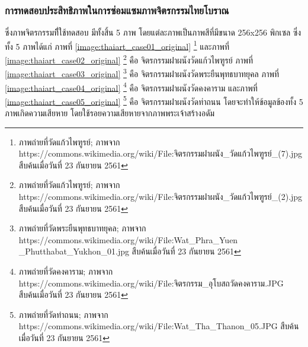 \documentclass[hidelinks, a4paper,12pt]{article}
\numberwithin{equation}{section}							%
\numberwithin{equation}{section}
\begin{document}
{	\subsubsection{การทดสอบประสิทธิภาพในการซ่อมแซมภาพจิตรกรรมไทยโบราณ}
	\hspace{1cm}ซึ่งภาพจิตรกรรมทีี่ใช้ทดสอบ มีทั้งสิ้น 5  ภาพ โดยแต่ละภาพเป็นภาพสีที่มีขนาด 256x256 พิกเซล ซึ่งทั้ง 5 ภาพได้แก่ ภาพที่ \ref{image:thaiart_case01_original} \footnote{ภาพถ่ายที่วัดแก้วไพฑูรย์; ภาพจาก  https://commons.wikimedia.org/wiki/File:จิตรกรรมฝาผนัง\_วัดแก้วไพฑูรย์\_(7).jpg สืบค้นเมื่อวันที่ 23 กันยายน 2561}   และภาพที่ \ref{image:thaiart_case02_original} \footnote{ภาพถ่ายที่วัดแก้วไพฑูรย์; ภาพจาก  https://commons.wikimedia.org/wiki/File:จิตรกรรมฝาผนัง\_วัดแก้วไพฑูรย์\_(2).jpg สืบค้นเมื่อวันที่ 23 กันยายน 2561} คือ จิตรกรรมฝาผนังวัดแก้วไพฑูรย์ ภาพที่ \ref{image:thaiart_case03_original} \footnote{ภาพถ่ายที่วัดพระยืนพุทธบาทยุคล; ภาพจาก https://commons.wikimedia.org/wiki/File:Wat\_Phra\_Yuen \_Phutthabat\_Yukhon\_01.jpg สืบค้นเมื่อวันที่ 23 กันยายน 2561}  คือ จิตรกรรมฝาผนังวัดพระยืนพุทธบาทยุคล ภาพที่ \ref{image:thaiart_case04_original} \footnote{ภาพถ่ายที่วัดคงคาราม; ภาพจาก  https://commons.wikimedia.org/wiki/File:จิตรกรรม\_อุโบสถวัดคงคาราม.JPG สืบค้นเมื่อวันที่ 23 กันยายน 2561} คือ จิตรกรรมฝาผนังวัดคงคาราม และภาพที่ \ref{image:thaiart_case05_original} \footnote{ภาพถ่ายที่วัดท่าถนน; ภาพจาก  https://commons.wikimedia.org/wiki/File:Wat\_Tha\_Thanon\_05.JPG สืบค้นเมื่อวันที่ 23 กันยายน 2561} คือ จิตรกรรมฝาผนังวัดท่าถนน
	โดยจะทำให้ข้อมูลข้องทั้ง 5 ภาพเกิดความเสียหาย โดยใช้รอยความเสียหายจากภาพพระเจ้าสร้างอดัม
	
}
\end{document}
